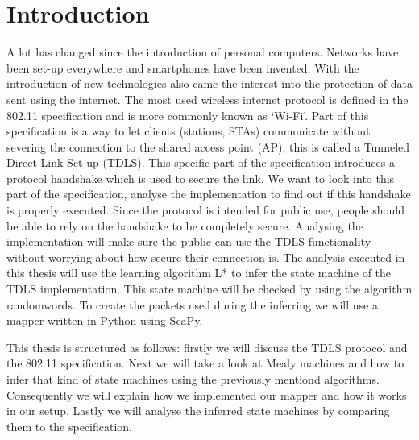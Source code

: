 \chapter{Introduction}\label{introduction}

\iffalse
The introduction of your bachelor thesis introduces the research area, the
research hypothesis, and the scientific contributions of your work.
A good narrative structure is the one suggested by Simon Peyton Jones
\cite{80211}:
%
\begin{itemize}
\item describe the problem / research question
\item motivate why this problem must be solved
\item demonstrate that a (new) solution is needed
\item explain the intuition behind your solution
\item motivate why / how your solution solves the problem (this is technical)
\item explain how it compares with related work
\end{itemize}
\fi


A lot has changed since the introduction of personal computers. Networks have been set-up everywhere and smartphones have been invented. With the introduction of new technologies also came the interest into the protection of data sent using the internet. The most used wireless internet protocol is defined in the 802.11 specification \cite{80211} and is more commonly known as ‘Wi-Fi’. Part of this specification is a way to let clients (stations, STAs) communicate without severing the connection to the shared access point (AP), this is called a Tunneled Direct Link Set-up (TDLS).  This specific part of the specification introduces a protocol handshake which is used to secure the link. We want to look into this part of the specification, analyse the implementation to find out if this handshake is properly executed. Since the protocol is intended for public use, people should be able to rely on the handshake to be completely secure. Analysing the implementation will make sure the public can use the TDLS functionality without worrying about how secure their connection is. The analysis executed in this thesis will use the learning algorithm L* to infer the state machine of the TDLS implementation. This state machine will be checked by using the algorithm randomwords. To create the packets used during the inferring we will use a mapper written in Python using ScaPy.

This thesis is structured as follows: firstly we will discuss the TDLS protocol and the 802.11 specification. Next we will take a look at Mealy machines and how to infer that kind of state machines using the previously mentiond algorithms. Consequently we will explain how we implemented our mapper and how it works in our setup. Lastly we will analyse the inferred state machines by comparing them to the specification.